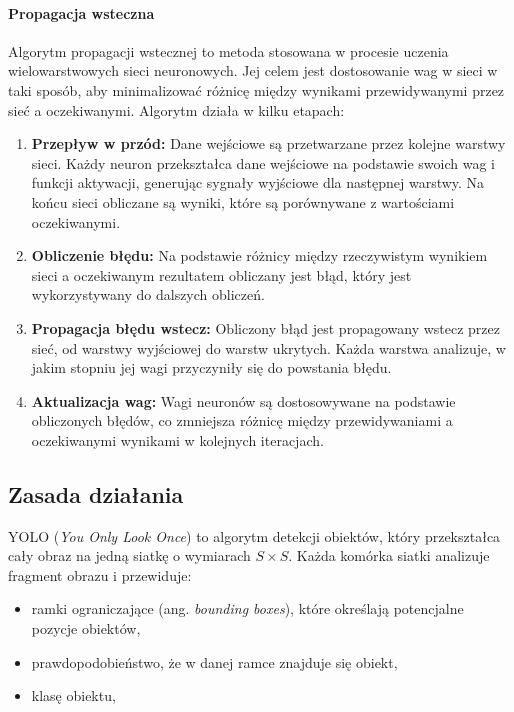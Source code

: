 \documentclass[a4paper,twoside,12pt]{book}
\begin{document}
\paragraph{Propagacja wsteczna}
Algorytm propagacji wstecznej to metoda stosowana w procesie uczenia wielowarstwowych sieci neuronowych. Jej celem jest dostosowanie wag w sieci w taki sposób, aby minimalizować różnicę między wynikami przewidywanymi przez sieć a oczekiwanymi. Algorytm działa w kilku etapach:

\begin{enumerate}
    \item \textbf{Przepływ w przód:} Dane wejściowe są przetwarzane przez kolejne warstwy sieci. Każdy neuron przekształca dane wejściowe na podstawie swoich wag i funkcji aktywacji, generując sygnały wyjściowe dla następnej warstwy. Na końcu sieci obliczane są wyniki, które są porównywane z wartościami oczekiwanymi.
    \item \textbf{Obliczenie błędu:} Na podstawie różnicy między rzeczywistym wynikiem sieci a oczekiwanym rezultatem obliczany jest błąd, który jest wykorzystywany do dalszych obliczeń.
    \item \textbf{Propagacja błędu wstecz:} Obliczony błąd jest propagowany wstecz przez sieć, od warstwy wyjściowej do warstw ukrytych. Każda warstwa analizuje, w jakim stopniu jej wagi przyczyniły się do powstania błędu.
    \item \textbf{Aktualizacja wag:} Wagi neuronów są dostosowywane na podstawie obliczonych błędów, co zmniejsza różnicę między przewidywaniami a oczekiwanymi wynikami w kolejnych iteracjach.
\end{enumerate}

\subsection{Zasada działania}
YOLO (\textit{You Only Look Once}) to algorytm detekcji obiektów, który przekształca cały obraz na jedną siatkę o wymiarach \( S \times S \). Każda komórka siatki analizuje fragment obrazu i przewiduje:
\begin{itemize}
    \item ramki ograniczające (ang. \textit{bounding boxes}), które określają potencjalne pozycje obiektów,
    \item prawdopodobieństwo, że w danej ramce znajduje się obiekt,
    \item klasę obiektu,
\end{itemize}
\end{document}
